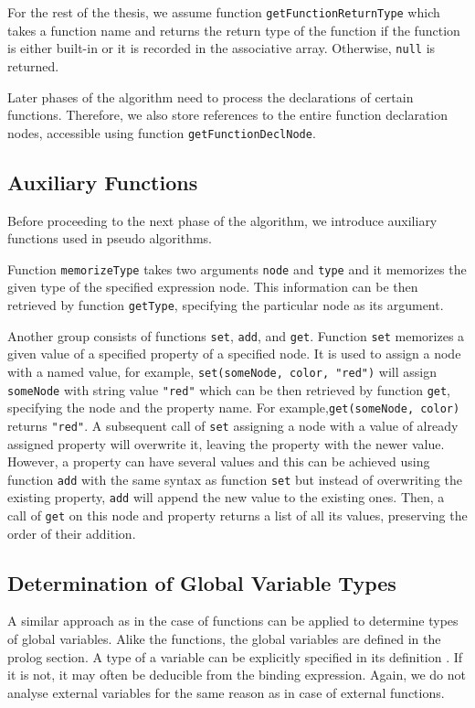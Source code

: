 
For the rest of the thesis, we assume function \texttt{getFunctionReturnType} which takes a function name and returns the return type of the function if the function is either built-in or it is recorded in the associative array. Otherwise, \texttt{null} is returned.

Later phases of the algorithm need to process the declarations of certain functions. Therefore, we also store references to the entire function declaration nodes, accessible using function \texttt{getFunctionDeclNode}.

\subsection{Auxiliary Functions}
Before proceeding to the next phase of the algorithm, we introduce auxiliary functions used in pseudo algorithms.

Function \texttt{memorizeType} takes two arguments \texttt{node} and \texttt{type} and it memorizes the given type of the specified expression node. This information can be then retrieved by function \texttt{getType}, specifying the particular node as its argument.

Another group consists of functions \texttt{set}, \texttt{add}, and \texttt{get}. Function \texttt{set} memorizes a given value of a specified property of a specified node. It is used to assign a node with a named value, for example, \texttt{set(someNode, color, "red")} will assign \texttt{someNode} with string value \texttt{"red"} which can be then retrieved by function \texttt{get}, specifying the node and the property name. For example,\linebreak \texttt{get(someNode, color)} returns \texttt{"red"}. A subsequent call of \texttt{set} assigning a node with a value of already assigned property will overwrite it, leaving the property with the newer value. However, a property can have several values and this can be achieved using function \texttt{add} with the same syntax as function \texttt{set} but instead of overwriting the existing property, \texttt{add} will append the new value to the existing ones. Then, a call of \texttt{get} on this node and property returns a list of all its values, preserving the order of their addition.

\subsection{Determination of Global Variable Types}
A similar approach as in the case of functions can be applied to determine types of global variables. Alike the functions, the global variables are defined in the prolog section. A type of a variable can be explicitly specified in its definition . If it is not, it may often be deducible from the binding expression. Again, we do not analyse external variables for the same reason as in case of external functions.

